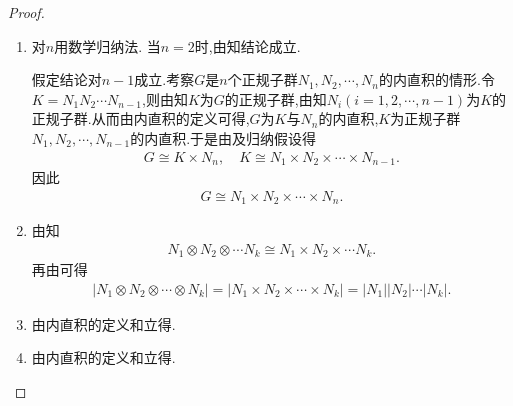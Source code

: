 \documentclass[../../main.tex]{subfiles}%
\begin{document}
\begin{proof}
\begin{enumerate}[(1)]
\item 对$n$用数学归纳法.
当$n=2$时,由知结论成立.

假定结论对$n-1$成立.考察$G$是$n$个正规子群$N_1,N_2,\cdots,N_n$的内直积的情形.令$K=N_1N_2\cdots N_{n-1}$,则由知$K$为$G$的正规子群,由知$N_i(i=1,2,\cdots,n-1)$为$K$的正规子群.从而由内直积的定义可得,$G$为$K$与$N_n$的内直积,$K$为正规子群$N_1,N_2,\cdots,N_{n-1}$的内直积.于是由及归纳假设得
\begin{align*}
G \cong K \times N_n, \quad
K \cong N_1 \times N_2 \times \cdots \times N_{n-1}.
\end{align*}
因此
\begin{align*}
G \cong N_1 \times N_2 \times \cdots \times N_n.
\end{align*}

\item 由知
\begin{align*}
N_1\otimes N_2 \otimes \cdots N_k\cong N_1\times N_2\times \cdots N_k.
\end{align*}
再由可得
\begin{align*}
\left| N_1\otimes N_2\otimes \cdots \otimes N_k \right|=\left| N_1\times N_2\times \cdots \times N_k \right|=\left| N_1 \right|\left| N_2 \right|\cdots \left| N_k \right|.
\end{align*}

\item 由内直积的定义和立得.

\item 由内直积的定义和立得.


\end{enumerate}
\end{proof}
\end{document}
